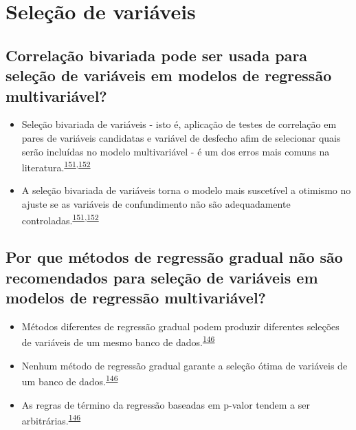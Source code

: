 \documentclass[
]{book}
\begin{document}
\hypertarget{selecao}{%
\section{Seleção de variáveis}\label{selecao}}

\hypertarget{correlauxe7uxe3o-bivariada-pode-ser-usada-para-seleuxe7uxe3o-de-variuxe1veis-em-modelos-de-regressuxe3o-multivariuxe1vel}{%
\subsection{Correlação bivariada pode ser usada para seleção de variáveis em modelos de regressão multivariável?}\label{correlauxe7uxe3o-bivariada-pode-ser-usada-para-seleuxe7uxe3o-de-variuxe1veis-em-modelos-de-regressuxe3o-multivariuxe1vel}}

\begin{itemize}
\item
  Seleção bivariada de variáveis - isto é, aplicação de testes de correlação em pares de variáveis candidatas e variável de desfecho afim de selecionar quais serão incluídas no modelo multivariável - é um dos erros mais comuns na literatura.\textsuperscript{\protect\hyperlink{ref-Dales1978}{151},\protect\hyperlink{ref-Sun1996}{152}}
\item
  A seleção bivariada de variáveis torna o modelo mais suscetível a otimismo no ajuste se as variáveis de confundimento não são adequadamente controladas.\textsuperscript{\protect\hyperlink{ref-Dales1978}{151},\protect\hyperlink{ref-Sun1996}{152}}
\end{itemize}

\hypertarget{por-que-muxe9todos-de-regressuxe3o-gradual-nuxe3o-suxe3o-recomendados-para-seleuxe7uxe3o-de-variuxe1veis-em-modelos-de-regressuxe3o-multivariuxe1vel}{%
\subsection{Por que métodos de regressão gradual não são recomendados para seleção de variáveis em modelos de regressão multivariável?}\label{por-que-muxe9todos-de-regressuxe3o-gradual-nuxe3o-suxe3o-recomendados-para-seleuxe7uxe3o-de-variuxe1veis-em-modelos-de-regressuxe3o-multivariuxe1vel}}

\begin{itemize}
\item
  Métodos diferentes de regressão gradual podem produzir diferentes seleções de variáveis de um mesmo banco de dados.\textsuperscript{\protect\hyperlink{ref-Healy1995}{146}}
\item
  Nenhum método de regressão gradual garante a seleção ótima de variáveis de um banco de dados.\textsuperscript{\protect\hyperlink{ref-Healy1995}{146}}
\item
  As regras de término da regressão baseadas em p-valor tendem a ser arbitrárias.\textsuperscript{\protect\hyperlink{ref-Healy1995}{146}}
\end{itemize}
\end{document}
